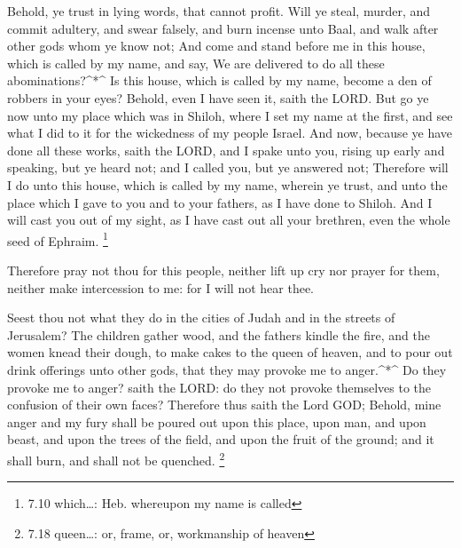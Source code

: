  Behold, ye trust in lying words, that cannot profit.
 Will ye steal, murder, and commit adultery, and swear
falsely, and burn incense unto Baal, and walk after other gods whom ye
know not;  And come and stand before me in this house,
which is called by my name, and say, We are delivered to do all these
abominations?\^{}*\^{}  Is this house, which is called by
my name, become a den of robbers in your eyes? Behold, even I have seen
it, saith the LORD.  But go ye now unto my place which was
in Shiloh, where I set my name at the first, and see what I did to it
for the wickedness of my people Israel.  And now, because
ye have done all these works, saith the LORD, and I spake unto you,
rising up early and speaking, but ye heard not; and I called you, but ye
answered not;  Therefore will I do unto this house, which
is called by my name, wherein ye trust, and unto the place which I gave
to you and to your fathers, as I have done to Shiloh.  And
I will cast you out of my sight, as I have cast out all your brethren,
even the whole seed of Ephraim. \footnote{7.10 which\ldots: Heb.
  whereupon my name is called}

 Therefore pray not thou for this people, neither lift up
cry nor prayer for them, neither make intercession to me: for I will not
hear thee.

 Seest thou not what they do in the cities of Judah and in
the streets of Jerusalem?  The children gather wood, and
the fathers kindle the fire, and the women knead their dough, to make
cakes to the queen of heaven, and to pour out drink offerings unto other
gods, that they may provoke me to anger.\^{}*\^{}  Do they
provoke me to anger? saith the LORD: do they not provoke themselves to
the confusion of their own faces?  Therefore thus saith the
Lord GOD; Behold, mine anger and my fury shall be poured out upon this
place, upon man, and upon beast, and upon the trees of the field, and
upon the fruit of the ground; and it shall burn, and shall not be
quenched. \footnote{7.18 queen\ldots: or, frame, or, workmanship of
  heaven}

